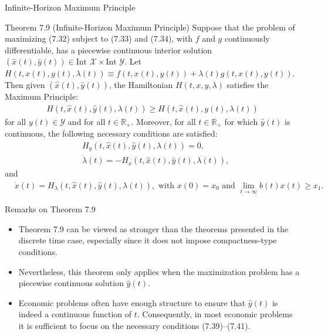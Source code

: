 \documentclass[9pt,aspectratio=169]{beamer}
\newcommand{\X}{\mathcal{X}}
\newcommand{\Y}{\mathcal{Y}}
\begin{document}
\begin{frame}{Infinite-Horizon Maximum Principle}
\begin{block}{Theorem 7.9 (Infinite-Horizon Maximum Principle)}
    Suppose that the problem of maximizing (7.32) subject to (7.33) and
    (7.34), with $f$ and $g$ continuously differentiable, has a piecewise
    continuous interior solution $(\hat{x}(t), \hat{y}(t)) \in \text{Int } \X
    \times \text{Int } \Y$. Let $H(t, x(t), y(t), \lambda(t)) \equiv f(t, x(t), y(t)) +
    \lambda(t)g(t, x(t), y(t))$. Then given $(\hat{x}(t), \hat{y}(t))$, the
    Hamiltonian $H(t, x, y, \lambda)$ satisfies the Maximum Principle:
    \begin{align*}
        H(t, \hat{x}(t), \hat{y}(t), \lambda(t)) \geq H(t, \hat{x}(t), y(t), \lambda(t))
    \end{align*}
    for all $y(t) \in \Y$ and for all $t \in \mathbb{R}_+$. Moreover, for all
    $t \in \mathbb{R}_+$ for which $\hat{y}(t)$ is continuous, the following
    necessary conditions are satisfied:
    \begin{align}
        &H_y(t, \hat{x}(t), \hat{y}(t), \lambda(t)) = 0, \tag{7.39} \\
        &\dot{\lambda}(t) = -H_x(t, \hat{x}(t), \hat{y}(t), \lambda(t)),
        \tag{7.40}
    \end{align}
    and
    \begin{align}
        &\dot{x}(t) = H_\lambda(t, \hat{x}(t), \hat{y}(t), \lambda(t)),
        \text{ with } x(0) = x_0 \text{ and } \lim_{t \to \infty} b(t)x(t)
        \geq x_1. \tag{7.41} 
    \end{align}

\end{block}
\end{frame}

\begin{frame}{Remarks on Theorem 7.9}
    \begin{itemize}
        \item Theorem 7.9 can be viewed as stronger than the theorems
        presented in the discrete time case, especially since it does not
        impose compactness-type conditions.
        \item Nevertheless, this theorem only applies when the maximization problem
        has a piecewise continuous solution $\hat{y}(t)$.
        \item Economic problems often have enough structure to ensure that
        $\hat{y}(t)$ is indeed a continuous function of $t$. Consequently, in
        most economic problems it is sufficient to focus on the necessary
        conditions (7.39)–(7.41).
\end{itemize}
\end{frame}
\end{document}
